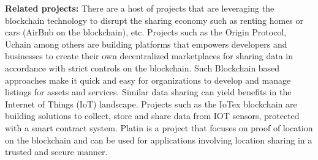 %
%
%

\noindent
{\bf Related projects:}
There are a host of projects that are leveraging the blockchain technology to disrupt the
sharing economy such as renting homes or cars (AirBnb on the blockchain), etc. Projects such as the Origin Protocol,
Uchain among others are building platforms that empowers developers and businesses to create their own decentralized
marketplaces for sharing data in accordance with strict controls on the blockchain.  Such Blockchain based approaches
make it quick and easy for organizations to develop and manage listings for assets and services. Similar data sharing
can yield benefits in the Internet of Things (IoT) landscape. Projects such as the IoTex blockchain are building
solutions to collect, store and share data from IOT sensors, protected with a smart contract system.
Platin \cite{platin} is a project that focuses on proof of location on the blockchain and can be used for applications
involving location sharing in a trusted and secure manner.

